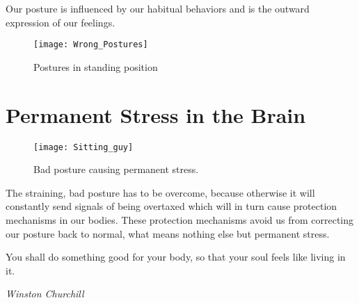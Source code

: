 \documentclass[../main.tex]{subfiles}
\begin{document}
Our posture is influenced by our habitual behaviors and is the outward expression of our feelings.
\begin{figure}[h!]
  \centering
  \texttt{[image: Wrong\_Postures]}
  \caption{Postures in standing position~\cite{Haltung}}
\end{figure}
\newpage

\section{Permanent Stress in the Brain}

\begin{figure}[h!]
  \centering
  \texttt{[image: Sitting\_guy]}
  \caption{Bad posture causing permanent stress.~\cite{Haltung}}
\end{figure}

The straining, bad posture has to be overcome, because otherwise it will constantly send signals of being overtaxed which will in turn cause protection mechanisms in our bodies.
These protection mechanisms avoid us from correcting our posture back to normal, what means nothing else but permanent stress.

\epigraph{You shall do something good for your body, so that your soul feels like living in it.}{\textit{Winston Churchill}}
  
\end{document}
